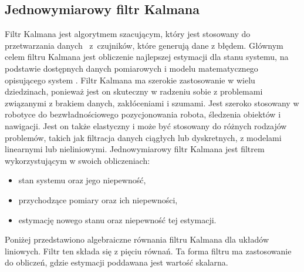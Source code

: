 {{    \subsection{Jednowymiarowy filtr Kalmana}
    {
        Filtr Kalmana jest algorytmem szacującym, który jest stosowany do przetwarzania danych ~z~czujników, które generują dane z błędem. Głównym celem filtru Kalmana jest obliczenie najlepszej estymacji dla stanu systemu, na podstawie dostępnych danych pomiarowych i modelu matematycznego opisującego system \cite{kalman_1d}. Filtr Kalmana ma szerokie zastosowanie w wielu dziedzinach, ponieważ jest on skuteczny w radzeniu sobie z problemami związanymi z brakiem danych, zakłóceniami i szumami. Jest szeroko stosowany w robotyce do bezwładnościowego pozycjonowania robota, śledzenia obiektów i nawigacji. Jest on także elastyczny i może być stosowany do różnych rodzajów problemów, takich jak filtracja danych ciągłych lub dyskretnych, z modelami linearnymi lub nieliniowymi.
        Jednowymiarowy filtr Kalmana \cite{kalman_1d} jest filtrem wykorzystującym w swoich obliczeniach:
        \begin{itemize}
            \item stan systemu oraz jego niepewność,
            \item przychodzące pomiary oraz ich niepewności,
            \item estymację nowego stanu oraz niepewność tej estymacji.
        \end{itemize}

        \newpage
        Poniżej przedstawiono algebraiczne równania filtru Kalmana dla układów liniowych. Filtr ten składa się z pięciu równań. Ta forma filtru ma zastosowanie do obliczeń, gdzie estymacji poddawana jest wartość skalarna.
        
}}}
